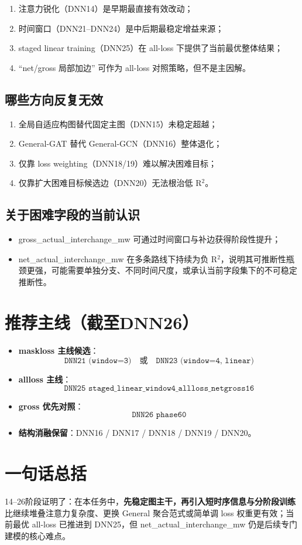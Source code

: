 \documentclass[UTF8]{ctexart}
\begin{document}
\begin{enumerate}
    \item 注意力锐化（DNN14）是早期最直接有效改动；
    \item 时间窗口（DNN21--DNN24）是中后期最稳定增益来源；
    \item staged linear training（DNN25）在 all-loss 下提供了当前最优整体结果；
    \item ``net/gross 局部加边'' 可作为 all-loss 对照策略，但不是主因解。
\end{enumerate}

\subsection{哪些方向反复无效}

\begin{enumerate}
    \item 全局自适应构图替代固定主图（DNN15）未稳定超越；
    \item General-GAT 替代 General-GCN（DNN16）整体退化；
    \item 仅靠 loss weighting（DNN18/19）难以解决困难目标；
    \item 仅靠扩大困难目标候选边（DNN20）无法根治低 R\(^2\)。
\end{enumerate}

\subsection{关于困难字段的当前认识}

\begin{itemize}
    \item gross\_actual\_interchange\_mw 可通过时间窗口与补边获得阶段性提升；
    \item net\_actual\_interchange\_mw 在多条路线下持续为负 R\(^2\)，说明其可推断性瓶颈更强，可能需要单独分支、不同时间尺度，或承认当前字段集下的不可稳定推断性。
\end{itemize}

\section{推荐主线（截至DNN26）}

\begin{itemize}
    \item \textbf{maskloss 主线候选}：
    \[
    \texttt{DNN21 (window=3)} \quad \text{或} \quad \texttt{DNN23 (window=4, linear)}
    \]
    \item \textbf{allloss 主线}：
    \[
    \texttt{DNN25 staged\_linear\_window4\_allloss\_netgross16}
    \]
    \item \textbf{gross 优先对照}：
    \[
    \texttt{DNN26 phase60}
    \]
    \item \textbf{结构消融保留}：DNN16 / DNN17 / DNN18 / DNN19 / DNN20。
\end{itemize}

\section{一句话总括}

14--26阶段证明了：在本任务中，\textbf{先稳定图主干，再引入短时序信息与分阶段训练} 比继续堆叠注意力复杂度、更换 General 聚合范式或简单调 loss 权重更有效；当前最优 all-loss 已推进到 DNN25，但 net\_actual\_interchange\_mw 仍是后续专门建模的核心难点。
\end{document}
